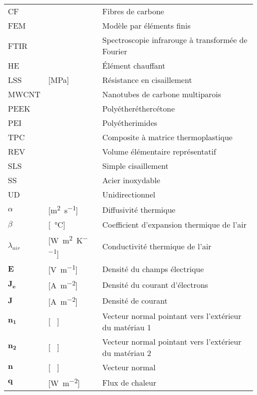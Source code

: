 \begin{longtable}{l p{3cm} p{5in}}
CF					& 										& Fibres de carbone										\\
FEM 				& 										& Modèle par éléments finis								\\
FTIR				&										& Spectroscopie infrarouge à transformée de Fourier 	\\
HE					& 										& Élément chauffant										\\
LSS 				& [\si{\mega\pascal}]					& Résistance en cisaillement 							\\
MWCNT 				& 										& Nanotubes de carbone multiparois 						\\
PEEK				&										& Polyétheréthercétone									\\
PEI					&										& Polyétherimides										\\
TPC					& 										& Composite à matrice thermoplastique					\\
REV 				& 										& Volume élémentaire représentatif 						\\
SLS					&										& Simple cisaillement									\\
SS					&										& Acier inoxydable 										\\
UD					&										& Unidirectionnel										\\
$\alpha$			& [\si{\square\metre\per\second}] 		& Diffusivité thermique 								\\
$\beta$				& [\si{\per\celsius}] 					& Coefficient d'expansion thermique de l'air 			\\
$\lambda_{air}$		& [\si{\watt\per\square\metre\per\kelvin}] 	& Conductivité thermique de l'air 					\\
$\mathbf{E}$		& [\si{\volt\per\metre}] 				& Densité du champs électrique 							\\
$\mathbf{J_e}$ 		& [\si{\ampere\per\square\metre}] 		& Densité du courant d'électrons 						\\
$\mathbf{J}$        & [\si{\ampere\per\square\metre}] 		& Densité de courant 									\\
$\mathbf{n_1}$ 		& [ \ ] 								& Vecteur normal pointant vers l'extérieur du matériau 1\\
$\mathbf{n_2}$ 		& [ \ ] 								& Vecteur normal pointant vers l'extérieur du matériau 2\\
$\mathbf{n}$ 		& [ \ ] 								& Vecteur normal  										\\
$\mathbf{q}$ 		& [\si{\watt\per\square\metre}] 		& Flux de chaleur   									\\

\end{longtable}

